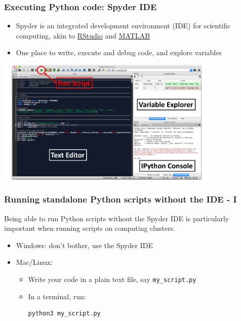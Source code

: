 \documentclass[xcolor=table]{beamer}
\begin{document}
\begin{frame}[fragile]
\frametitle{Executing Python code: Spyder IDE}
\begin{itemize}\addtolength{\itemsep}{.7\baselineskip}
	\item Spyder is an integrated development environment (IDE) for scientific computing, akin to \href{https://www.rstudio.com/}{RStudio} and \href{https://uk.mathworks.com/products/matlab.html}{MATLAB} 
	\item One place to write, execute and debug code, and explore variables
\end{itemize}

\begin{center}
\includegraphics[width=0.8\textwidth]{spyder_annotated.pdf}
\end{center}
\end{frame}

\begin{frame}[fragile]
\frametitle{Running standalone Python scripts without the IDE - I}
Being able to run Python scripts without the Spyder IDE is particularly important when running scripts on computing clusters. 

    
\begin{itemize}
    \item Windows: don't bother, use the Spyder IDE
        \pause
    \item Mac/Linux: 
        \begin{itemize}
            \item Write your code in a plain text file, say \texttt{my\_script.py}
                \pause
            \item In a terminal, run:
\begin{lstlisting}[style=bash]
python3 my_script.py
\end{lstlisting}
\end{itemize}
\end{itemize}

\end{frame}
\end{document}

